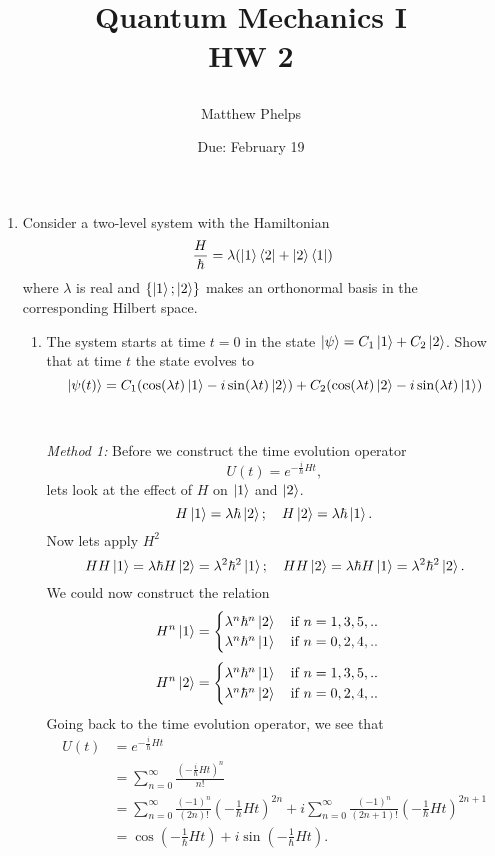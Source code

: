 \documentclass[11pt,letterpaper]{article}
\title{\begin{spacing}{1.2}Quantum Mechanics I\\HW 2\end{spacing}}
\author{Matthew Phelps}
\date{Due: February 19}
\begin{document}
\maketitle

\begin{enumerate}
  \item Consider a two-level system with the Hamiltonian
  $$\frac{H}{\hbar}=\lambda(\ket 1\bra 2+\ket 2\bra 1)$$
  where $\lambda$ is real and $\{\ket 1;\ket 2\}$ makes an orthonormal basis in the corresponding Hilbert space.
  \begin{enumerate}
  \item The system starts at time $t=0$ in the state $\ket\psi = C_1\ket 1+C_2\ket2$. Show that at time $t$ the state evolves to 
  \begin{equation}\label{9}\ket{\psi(t)} = C_1(\cos(\lambda t)\ket 1 - i\sin(\lambda t)\ket2)+C_2(\cos(\lambda t)\ket 2-i\sin(\lambda t)\ket 1)\end{equation}
\\  \\\emph{Method 1: }Before we construct the time evolution operator 
  $$U(t) = e^{-\frac{i}{\hbar}Ht},$$ lets look at the effect of $H$ on $\ket 1$ and $\ket 2$.
$$H\ket 1 = \lambda\hbar\ket 2;\quad H\ket 2 = \lambda\hbar\ket 1.$$
Now lets apply $H^2$
$$HH\ket 1= \lambda\hbar H\ket 2  = \lambda^2\hbar^2\ket1;\quad HH\ket 2= \lambda\hbar H\ket 1  = \lambda^2\hbar^2\ket2.$$
We could now construct the relation
$$H^n\ket 1 = \begin{cases}\lambda^n\hbar^n\ket 2\quad \text{if}\ n=1,3,5,..\\\lambda^n\hbar^n\ket 1\quad \text{if}\ n=0,2,4,..\end{cases}$$
$$H^n\ket 2 = \begin{cases}\lambda^n\hbar^n\ket 1\quad \text{if}\ n=1,3,5,..\\\lambda^n\hbar^n\ket 2\quad \text{if}\ n=0,2,4,..\end{cases}$$
Going back to the time evolution operator, we see that
\begin{align*}U(t) &= e^{-\frac{i}{\hbar}Ht} \\&= \sum_{n=0}^\infty{\frac{\left(-\frac{i}{\hbar}Ht\right)^n}{n!}}\\
&=\sum_{n=0}^\infty{\frac{(-1)^n}{(2n)!}\left(-\frac{1}{\hbar}Ht\right)^{2n}}+i\sum_{n=0}^\infty{\frac{(-1)^n}{(2n+1)!}\left(-\frac{1}{\hbar}Ht\right)^{2n+1}}\\
&=\cos(-\frac{1}{\hbar}Ht)+i\sin(-\frac{1}{\hbar}Ht).
\end{align*}

\end{enumerate}
\end{enumerate}
\end{document}
